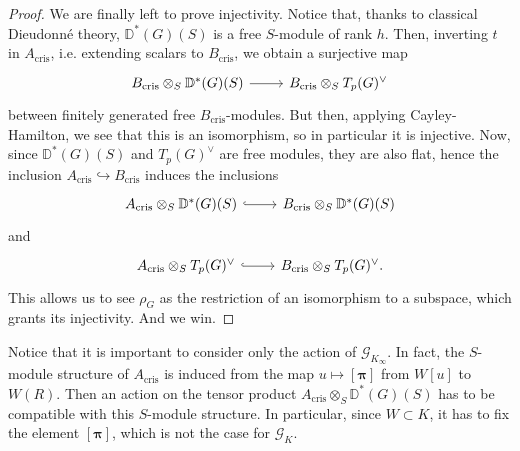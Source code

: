 \begin{proof}
	We are finally left to prove injectivity.
	Notice that, thanks to classical Dieudonné theory,
	$\mathbb{D}^*(G)(S)$ is a free $S$-module of rank $h$.
	Then, inverting $t$ in $A_{\mathrm{cris}}$, i.e. extending scalars
	to $B_{\mathrm{cris}}$, we obtain a surjective map
	\begin{equation*}
	\begin{tikzcd}[row sep = 0ex
		,/tikz/column 1/.append style={anchor=base east}
		,/tikz/column 2/.append style={anchor=base west}]
		B_{\mathrm{cris}} \otimes_S \mathbb{D}^*(G)(S)
		\arrow[r, "", rightarrow] &
		B_{\mathrm{cris}} \otimes_S T_p(G)^\vee
	\end{tikzcd}
	\end{equation*} 
	between finitely generated free $B_{\mathrm{cris}}$-modules.
	But then, applying Cayley-Hamilton, we see that this is an isomorphism,
	so in particular it is injective.
	Now, since $\mathbb{D}^*(G)(S)$ and $T_p(G)^\vee$ are free modules,
	they are also flat, hence the inclusion $A_{\mathrm{cris}} \hookrightarrow B_{\mathrm{cris}}$
	induces the inclusions
	\begin{equation*}
	\begin{tikzcd}
		A_{\mathrm{cris}} \otimes_S 
		\mathbb{D}^*(G)(S)
		\arrow[r, "", hookrightarrow] &
		B_{\mathrm{cris}} \otimes_S
		\mathbb{D}^*(G)(S)
	\end{tikzcd}
	\end{equation*}
	and
	\begin{equation*}
	\begin{tikzcd}
		A_{\mathrm{cris}} \otimes_S 
		T_p(G)^\vee
		\arrow[r, "", hookrightarrow] &
		B_{\mathrm{cris}} \otimes_S
		T_p(G)^\vee
	.\end{tikzcd}
	\end{equation*} 
	This allows us to see $\rho_G$ as the restriction of an isomorphism to a subspace,
	which grants its injectivity.
	And we win.
\end{proof}


\begin{rem}[]
	Notice that it is important to consider only the action of $\mathscr{G}_{K_\infty}$.
	In fact, the $S$-module structure of $A_{\mathrm{cris}}$ is induced from
	the map $u \mapsto \left[ \boldsymbol\pi \right]$ from $W[u]$ to $W(R)$.
	Then an action on the tensor product $A_{\mathrm{cris}} \otimes_S \mathbb{D}^*(G)(S)$
	has to be compatible with this $S$-module structure.
	In particular, since $W \subset K$, it has to fix the element $\left[ \boldsymbol\pi \right]$,
	which is not the case for $\mathscr{G}_K$.
\end{rem}


